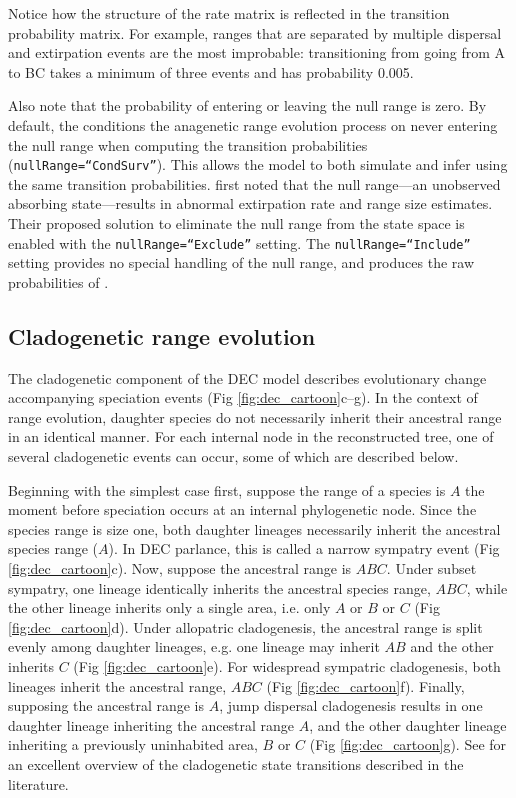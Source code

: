 Notice how the structure of the rate matrix is reflected in the transition probability matrix.
For example, ranges that are separated by multiple dispersal and extirpation events are the most improbable: transitioning from going from A to BC takes a minimum of three events and has probability 0.005.

Also note that the probability of entering or leaving the null range is zero.
By default, the \RevBayes conditions the anagenetic range evolution process on never entering the null range when computing the transition probabilities ({\tt nullRange=``CondSurv''}).
This allows the model to both simulate and infer using the same transition probabilities.
\citet{Massana2015} first noted that the null range---an unobserved absorbing state---results in abnormal extirpation rate and range size estimates.
Their proposed solution to eliminate the null range from the state space is enabled with the {\tt nullRange=``Exclude''} setting. 
The {\tt nullRange=``Include''} setting provides no special handling of the null range, and produces the raw probabilities of \citet{Ree2005}.

\subsection*{Cladogenetic range evolution}

The cladogenetic component of the DEC model describes evolutionary change accompanying speciation events (Fig \ref{fig:dec_cartoon}c--g).
In the context of range evolution, daughter species do not necessarily inherit their ancestral range in an identical manner.
For each internal node in the reconstructed tree, one of several cladogenetic events can occur, some of which are described below.

Beginning with the simplest case first, suppose the range of a species is $A$ the moment before speciation occurs at an internal phylogenetic node.
Since the species range is size one, both daughter lineages necessarily inherit the ancestral species range ($A$).
In DEC parlance, this is called a narrow sympatry event (Fig \ref{fig:dec_cartoon}c).
Now, suppose the ancestral range is $ABC$.
Under subset sympatry, one lineage identically inherits the ancestral species range, $ABC$, while the other lineage inherits only a single area, i.e. only $A$ or $B$ or $C$ (Fig \ref{fig:dec_cartoon}d).
Under allopatric cladogenesis, the ancestral range is split evenly among daughter lineages, e.g. one lineage may inherit $AB$ and the other inherits $C$ (Fig \ref{fig:dec_cartoon}e).
For widespread sympatric cladogenesis, both lineages inherit the ancestral range, $ABC$ (Fig \ref{fig:dec_cartoon}f).
Finally, supposing the ancestral range is $A$, jump dispersal cladogenesis results in one daughter lineage inheriting the ancestral range $A$, and the other daughter lineage inheriting a previously uninhabited area, $B$ or $C$ (Fig \ref{fig:dec_cartoon}g).
See \citet{Matzke2012} for an excellent overview of the cladogenetic state transitions described in the literature.

